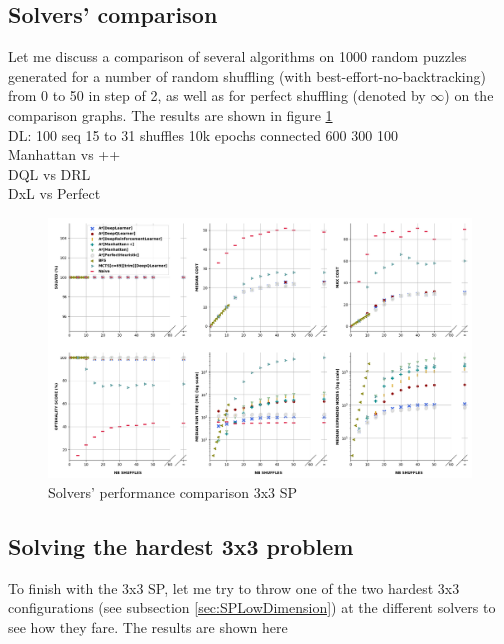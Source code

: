 \subsection{Solvers' comparison}
\label{ssec:33SPSC}
\label{sec:S33DRLDQL}
Let me discuss a comparison of several algorithms on 1000 random puzzles generated for a number of random shuffling (with best-effort-no-backtracking) from 0 to 50 in step of 2, as well as for perfect shuffling (denoted by $\infty$) on the comparison graphs. The results are shown in figure \ref{fig:33SPPerformance}
\\
DL: 100 seq 15 to 31 shuffles 10k epochs connected 600 300 100
\\
Manhattan vs ++
\\
DQL vs DRL
\\
DxL vs Perfect





\begin{landscape}
\centering\vspace*{\fill}
\begin{figure}[H]
\centering
\includegraphics[scale=0.63]{./Figures/33SPPerformance}
\caption[33SPPerformance]{Solvers' performance comparison 3x3 SP}
\label{fig:33SPPerformance}
\end{figure}
\vfill
\end{landscape}
\restoregeometry


\subsection{Solving the hardest 3x3 problem}
To finish with the 3x3 SP, let me try to throw one of the two hardest 3x3 configurations (see subsection \ref{sec:SPLowDimension}) at the different solvers to see how they fare. The results are shown here

